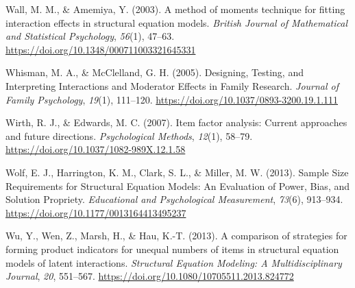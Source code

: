 \documentclass[
  man]{apa6}
\newlength{\cslhangindent}
\newlength{\cslentryspacingunit} %
\newenvironment{CSLReferences}[2] %
 {%
  \setlength{\parindent}{0pt}
  \ifodd #1
  \let\oldpar\par
  \def\par{\hangindent=\cslhangindent\oldpar}
  \fi
  \setlength{\parskip}{#2\cslentryspacingunit}
 }%
 {}
\begin{document}
\begin{CSLReferences}{1}{0}
\leavevmode{}%
Wall, M. M., \& Amemiya, Y. (2003). A method of moments technique for fitting interaction effects in structural equation models. \emph{British Journal of Mathematical and Statistical Psychology}, \emph{56}(1), 47--63. \url{https://doi.org/10.1348/000711003321645331}

\leavevmode{}%
Whisman, M. A., \& McClelland, G. H. (2005). Designing, {Testing}, and {Interpreting Interactions} and {Moderator Effects} in {Family Research}. \emph{Journal of Family Psychology}, \emph{19}(1), 111--120. \url{https://doi.org/10.1037/0893-3200.19.1.111}

\leavevmode{}%
Wirth, R. J., \& Edwards, M. C. (2007). Item factor analysis: {Current} approaches and future directions. \emph{Psychological Methods}, \emph{12}(1), 58--79. \url{https://doi.org/10.1037/1082-989X.12.1.58}

\leavevmode{}%
Wolf, E. J., Harrington, K. M., Clark, S. L., \& Miller, M. W. (2013). Sample {Size Requirements} for {Structural Equation Models}: {An Evaluation} of {Power}, {Bias}, and {Solution Propriety}. \emph{Educational and Psychological Measurement}, \emph{73}(6), 913--934. \url{https://doi.org/10.1177/0013164413495237}

\leavevmode{}%
Wu, Y., Wen, Z., Marsh, H., \& Hau, K.-T. (2013). A comparison of strategies for forming product indicators for unequal numbers of items in structural equation models of latent interactions. \emph{Structural Equation Modeling: A Multidisciplinary Journal}, \emph{20}, 551--567. \url{https://doi.org/10.1080/10705511.2013.824772}

\end{CSLReferences}
\end{document}
